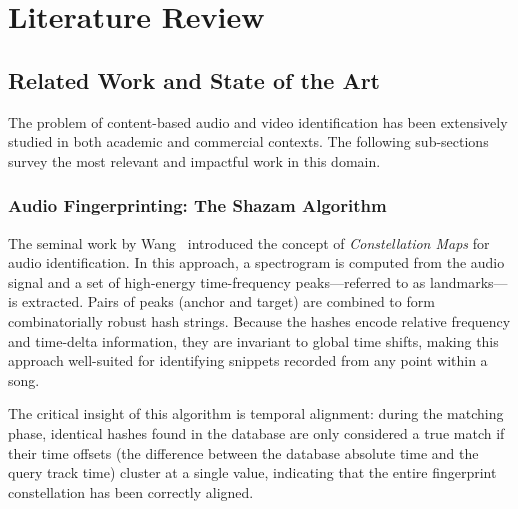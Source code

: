 \newpage
\chapter{Literature Review}

\section{Related Work and State of the Art}

The problem of content-based audio and video identification has been extensively studied in both academic and commercial contexts. The following sub-sections survey the most relevant and impactful work in this domain.

\subsection{Audio Fingerprinting: The Shazam Algorithm}
The seminal work by Wang~\cite{wang2003} introduced the concept of \textit{Constellation Maps} for audio identification. In this approach, a spectrogram is computed from the audio signal and a set of high-energy time-frequency peaks---referred to as landmarks---is extracted. Pairs of peaks (anchor and target) are combined to form combinatorially robust hash strings. Because the hashes encode relative frequency and time-delta information, they are invariant to global time shifts, making this approach well-suited for identifying snippets recorded from any point within a song.

The critical insight of this algorithm is temporal alignment: during the matching phase, identical hashes found in the database are only considered a true match if their time offsets (the difference between the database absolute time and the query track time) cluster at a single value, indicating that the entire fingerprint constellation has been correctly aligned.

